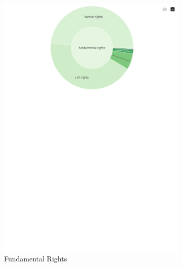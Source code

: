\begin{figure}[!htbp]
    \centering
	\begin{subfigure}{0.45\textwidth}
            \centering
		\includegraphics[trim={0 0 0 0},clip,width=0.8\linewidth]{figures/baly_iptc_weighted_prop_leaning_corr_tfidf_zoom_fundamental_rights.pdf}
		\caption{Fundamental Rights}
            \label{fig:baly_iptc_weighted_prop_leaning_corr_tfidf_zoom_fundamental_rights}
	\end{subfigure}
	\begin{subfigure}{0.45\textwidth}

\end{subfigure}
\end{figure}
